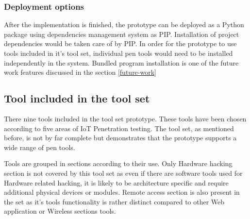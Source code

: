 	\subsubsection{Deployment options}
	After the implementation is finished, the prototype can be deployed as a Python package using dependencies management system as PIP. Installation of project dependencies would be taken care of by PIP. In order for the prototype to use tools included in it's tool set, individual pen tools would need to be installed independently in the system. Bundled program installation is one of the future work features discussed in the section \ref{future-work}


\subsection{Tool included in the tool set}
	There nine tools included in the tool set prototype. These tools have been chosen according to five areas of IoT Penetration testing\cite{cookbook}. The tool set, as mentioned before, is not by far complete but demonstrates that the prototype supports a wide range of pen tools. 
	
	Tools are grouped in sections according to their use. Only Hardware hacking section is not covered by this tool set as even if there are software tools used for Hardware related hacking, it is likely to be architecture specific and require additional physical devices or modules. Remote access section is also present in the set as it's tools functionality is rather distinct compared to other Web application or Wireless sections tools.
	

